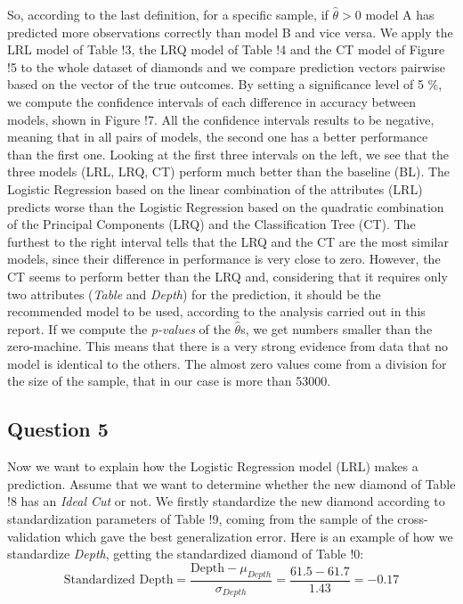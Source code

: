 \documentclass[
]{article}
\begin{document}
So, according to the last definition, for a specific sample, if
\(\hat{\theta} > 0\) model A has predicted more observations correctly
than model B and vice versa. We apply the LRL model of Table !3, the LRQ
model of Table !4 and the CT model of Figure !5 to the whole dataset of
diamonds and we compare prediction vectors pairwise based on the vector
of the true outcomes. By setting a significance level of 5 \%, we
compute the confidence intervals of each difference in accuracy between
models, shown in Figure !7. All the confidence intervals results to be
negative, meaning that in all pairs of models, the second one has a
better performance than the first one. Looking at the first three
intervals on the left, we see that the three models (LRL, LRQ, CT)
perform much better than the baseline (BL). The Logistic Regression
based on the linear combination of the attributes (LRL) predicts worse
than the Logistic Regression based on the quadratic combination of the
Principal Components (LRQ) and the Classification Tree (CT). The
furthest to the right interval tells that the LRQ and the CT are the
most similar models, since their difference in performance is very close
to zero. However, the CT seems to perform better than the LRQ and,
considering that it requires only two attributes (\emph{Table} and
\emph{Depth}) for the prediction, it should be the recommended model to
be used, according to the analysis carried out in this report. If we
compute the \emph{p-values} of the \(\hat{\theta}\)s, we get numbers
smaller than the zero-machine. This means that there is a very strong
evidence from data that no model is identical to the others. The almost
zero values come from a division for the size of the sample, that in our
case is more than 53000.

\hypertarget{question-5}{%
\subsection{Question 5}\label{question-5}}

Now we want to explain how the Logistic Regression model (LRL) makes a
prediction. Assume that we want to determine whether the new diamond of
Table !8 has an \emph{Ideal Cut} or not. We firstly standardize the new
diamond according to standardization parameters of Table !9, coming from
the sample of the cross-validation which gave the best generalization
error. Here is an example of how we standardize \emph{Depth}, getting
the standardized diamond of Table !0: \[
\text{Standardized Depth}=\frac{\text{Depth}-\mu_{Depth}}{\sigma_{Depth}}=\frac{61.5-61.7}{1.43}=-0.17
\]
\end{document}
